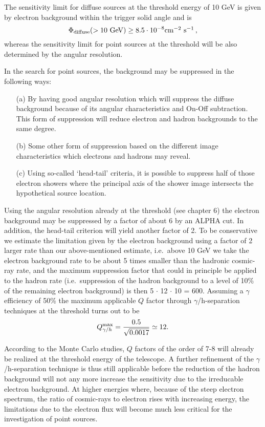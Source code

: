 The sensitivity limit for diffuse sources at the threshold energy of 10 GeV
is given by electron background within the trigger solid angle and is 
\[
\Phi _{{\rm diffuse}}(>10\ {\rm GeV})\geq 8.5\cdot 10^{-8}%
\mbox{cm$^{-2}$
s$^{-1}$}\,, 
\]
whereas the sensitivity limit for point sources at the threshold will be
also determined by the angular resolution.

In the search for point sources, the background may be suppressed in the following
ways:

\begin{itemize}
\item[(a)]  By having good angular resolution which will suppress the
diffuse background because of its angular characteristics and 
On-Off subtraction. This form of
suppression will reduce electron and hadron backgrounds to the same degree.

\item[(b)]  Some other form of suppression based on the different image
characteristics which electrons and hadrons may reveal.

\item[(c)]  Using so-called `head-tail' criteria, it is possible to suppress
half of those electron showers where the principal axis of the shower image
intersects the hypothetical source location.
\end{itemize}

Using the angular resolution already at the threshold (see chapter 6)
the electron background
may be suppressed by a factor of about 6 by an ALPHA cut. In addition, the
head-tail criterion will yield another factor of 2.
To be conservative we estimate the limitation given by the electron
background using a factor of 2 larger rate than our above-mentioned estimate,
i.e.\ 
above 10 GeV we take
the electron background rate to be about 5 times smaller than
the hadronic cosmic-ray rate, and the maximum suppression factor 
that could in principle be applied to the hadron
rate (i.e.\ suppression of
the hadron background to a level of 10\% of the remaining electron
background) is then 5 $\cdot$ 12 $\cdot$ 10 = 600.
Assuming a $\gamma$ efficiency of 50\%
the maximum applicable $Q$ factor through
$\gamma $/h-separation techniques at the threshold turns out to be
\[
Q_{\gamma /h}^{{\rm max}}=\frac{0.5}{\sqrt{0.0017}} \simeq 12.
\]

According to the Monte Carlo studies, $Q$ factors of
the order of 7-8 will already be
realized at the threshold energy of the telescope. A further
refinement of the $\gamma $/h-separation technique is thus still
applicable before the reduction of the hadron background will
not any more increase the sensitivity due to the irreducable
electron background. At higher energies where,
because of the steep electron spectrum, the ratio of cosmic-rays to electron
rises with increasing energy, the limitations due to the electron
flux will become much less critical for the investigation of point sources. 

